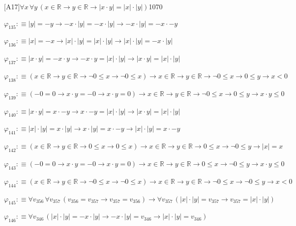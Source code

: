 \begin{fullproof}{[A17]}{$\forall x\,\forall y\,(x \in \mathbb{R} \to y \in \mathbb{R} \to \lvert x \cdot y \rvert = \lvert x \rvert \cdot \lvert y \rvert)$}{1070}
\begin{abbrevlist}
\item $\varphi_{135} :\equiv \lvert y \rvert = -y \to -x \cdot \lvert y \rvert = -x \cdot \lvert y \rvert \to -x \cdot \lvert y \rvert = -x \cdot -y$
\item $\varphi_{136} :\equiv \lvert x \rvert = -x \to \lvert x \rvert \cdot \lvert y \rvert = \lvert x \rvert \cdot \lvert y \rvert \to \lvert x \rvert \cdot \lvert y \rvert = -x \cdot \lvert y \rvert$
\item $\varphi_{137} :\equiv \lvert x \cdot y \rvert = -x \cdot y \to -x \cdot y = \lvert x \rvert \cdot \lvert y \rvert \to \lvert x \cdot y \rvert = \lvert x \rvert \cdot \lvert y \rvert$
\item $\varphi_{138} :\equiv (x \in \mathbb{R} \to y \in \mathbb{R} \to \neg 0 \leq x \to \neg 0 \leq x) \to x \in \mathbb{R} \to y \in \mathbb{R} \to \neg 0 \leq x \to 0 \leq y \to x < 0$
\item $\varphi_{139} :\equiv (-0 = 0 \to x \cdot y = -0 \to x \cdot y = 0) \to x \in \mathbb{R} \to y \in \mathbb{R} \to \neg 0 \leq x \to 0 \leq y \to x \cdot y \leq 0$
\item $\varphi_{140} :\equiv \lvert x \cdot y \rvert = x \cdot -y \to x \cdot -y = \lvert x \rvert \cdot \lvert y \rvert \to \lvert x \cdot y \rvert = \lvert x \rvert \cdot \lvert y \rvert$
\item $\varphi_{141} :\equiv \lvert x \rvert \cdot \lvert y \rvert = x \cdot \lvert y \rvert \to x \cdot \lvert y \rvert = x \cdot -y \to \lvert x \rvert \cdot \lvert y \rvert = x \cdot -y$
\item $\varphi_{142} :\equiv (x \in \mathbb{R} \to y \in \mathbb{R} \to 0 \leq x \to 0 \leq x) \to x \in \mathbb{R} \to y \in \mathbb{R} \to 0 \leq x \to \neg 0 \leq y \to \lvert x \rvert = x$
\item $\varphi_{143} :\equiv (-0 = 0 \to x \cdot y = -0 \to x \cdot y = 0) \to x \in \mathbb{R} \to y \in \mathbb{R} \to 0 \leq x \to \neg 0 \leq y \to x \cdot y \leq 0$
\item $\varphi_{144} :\equiv (x \in \mathbb{R} \to y \in \mathbb{R} \to \neg 0 \leq x \to \neg 0 \leq x) \to x \in \mathbb{R} \to y \in \mathbb{R} \to \neg 0 \leq x \to \neg 0 \leq y \to x < 0$
\item $\varphi_{145} :\equiv \forall v_{356}\,\forall v_{357}\,(v_{356} = v_{357} \to v_{357} = v_{356}) \to \forall v_{357}\,(\lvert x \rvert \cdot \lvert y \rvert = v_{357} \to v_{357} = \lvert x \rvert \cdot \lvert y \rvert)$
\item $\varphi_{146} :\equiv \forall v_{346}\,(\lvert x \rvert \cdot \lvert y \rvert = -x \cdot \lvert y \rvert \to -x \cdot \lvert y \rvert = v_{346} \to \lvert x \rvert \cdot \lvert y \rvert = v_{346})$

\end{abbrevlist}
\end{fullproof}
